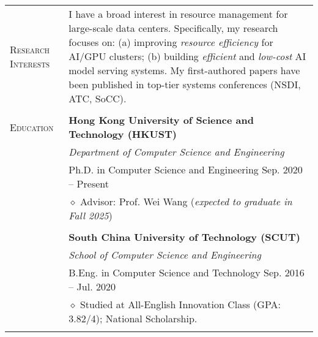 \documentclass[letterpaper, 12pt]{article}
\begin{document}
\begin{longtable}{p{1.0in}p{5.8in}}


\nohyphens{\textsc{Research Interests}}
& I have a broad interest in resource management for large-scale data centers.
Specifically, my research focuses on: (a) improving \textit{resource efficiency} for AI/GPU clusters; (b) building \textit{efficient} and \textit{low-cost} AI model serving systems.
My first-authored papers have been published in top-tier systems conferences (NSDI, ATC, SoCC).
\\
& \\


{\textsc{Education}}
& \textbf{Hong Kong University of Science and Technology (HKUST)} \\
& \textit{Department of Computer Science and Engineering} \\
& Ph.D. in Computer Science and Engineering \hfill Sep. 2020 -- Present \\
& $\diamond$ Advisor: Prof. Wei Wang \hfill (\textit{expected to graduate in Fall 2025}) \\
& \\

& \textbf{South China University of Technology (SCUT)} \\
& \textit{School of Computer Science and Engineering} \\
& B.Eng. in Computer Science and Technology \hfill Sep. 2016 -- Jul. 2020 \\
& $\diamond$ Studied at All-English Innovation Class (GPA: 3.82/4); National Scholarship. \\
& \\


\end{longtable}
\end{document}
